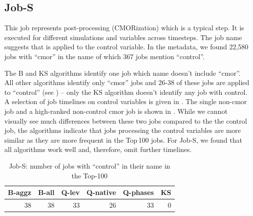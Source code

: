 \documentclass{jhps}
\begin{document}
\subsection{Job-S}

This job represents post-processing (CMORization) which is a typical step.
It is executed for different simulations and variables across timesteps.
The job name suggests that is applied to the control variable.
In the metadata, we found 22,580 jobs with “cmor” in the name of which 367 jobs mention “control”.

The B and KS algorithms identify one job which name doesn't include “cmor”.
All other algorithms identify only “cmor” jobs and 26-38 of these jobs are applied to “control” (see ) -- only the KS algorithm doesn't identify any job with control.
A selection of job timelines on control variables is given in .
The single non-cmor job and a high-ranked non-control cmor job is shown in .
While we cannot visually see much differences between these two jobs compared to the  the control job, the algorithms indicate that jobs processing the control variables are more similar as they are more frequent in the Top\,100 jobs.
For Job-S, we found that all algorithms work well and, therefore, omit further timelines.

\begin{table}[bt]
\centering
\begin{tabular}{r|r|r|r|r|r}
  B-aggz & B-all & Q-lev & Q-native & Q-phases & KS\\ \hline
  38 &   38 &   33 &   26 &   33 &       0
\end{tabular}

  \caption{Job-S: number of jobs with “control” in their name in the Top-100}%
  \label{tbl:control-jobs}
\end{table}
\end{document}
